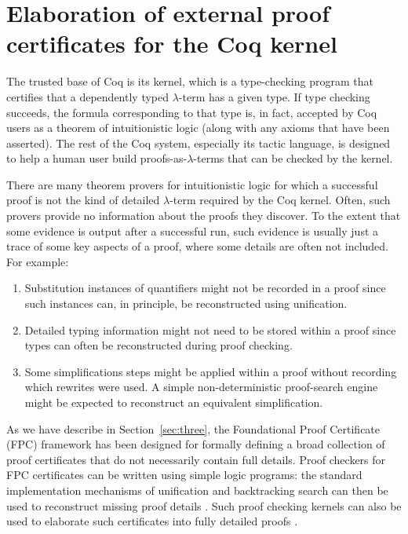 \section{Elaboration of external proof certificates for the Coq kernel}
\label{sec:elab}

The trusted base of Coq is its kernel, which is a type-checking
program that certifies that a dependently typed $\lambda$-term has a
given type.  If type checking succeeds, the formula corresponding to
that type is, in fact, accepted by Coq users as a theorem of
intuitionistic logic (along with any axioms that have been asserted).
The rest of the Coq system, especially its tactic language, is
designed to help a human user build proofs-as-$\lambda$-terms that can
be checked by the kernel.

There are many theorem provers for intuitionistic logic
\cite{raths07jar} for which a successful proof is not the kind of
detailed $\lambda$-term required by the Coq kernel.  Often, such
provers provide no information about the proofs they discover.  To the
extent that some  evidence is output after a successful run, such
evidence is usually just a trace of some key aspects of a proof, where some
details are often not included.  For example:
\begin{enumerate}

\item Substitution instances of quantifiers might not be recorded in a
  proof since such instances can, in principle, be reconstructed using
  unification.

\item Detailed typing information might not need to be stored within a
  proof since types can often be reconstructed during proof checking.

\item Some simplifications steps might be applied within a proof
  without recording which rewrites were used.  A simple 
  non-deterministic proof-search engine might be expected to
  reconstruct an equivalent simplification.
\end{enumerate}

As we have describe in Section~\ref{sec:three}, the Foundational Proof
Certificate (FPC) framework has been designed for formally defining a
broad collection of proof certificates that do not necessarily contain
full details.  Proof checkers for FPC certificates can be written
using simple logic programs: the standard implementation mechanisms of
unification and backtracking search can then be used to reconstruct
missing proof details \cite{miller17fac}.  Such proof checking kernels
can also be used to elaborate such certificates into fully detailed
proofs \cite{blanco17phd,blanco17cade}.


